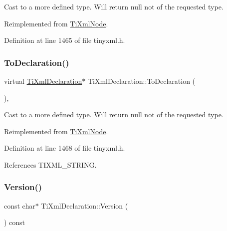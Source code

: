 Cast to a more defined type. Will return null not of the requested type. 



Reimplemented from \hyperlink{class_ti_xml_node_a0dc0831e89d499ca911a3be61a413d45}{Ti\+Xml\+Node}.



Definition at line 1465 of file tinyxml.\+h.

\hypertarget{class_ti_xml_declaration_a6bd3d1daddcaeb9543c24bfd090969ce}{}\label{class_ti_xml_declaration_a6bd3d1daddcaeb9543c24bfd090969ce} 
\subsubsection{\texorpdfstring{To\+Declaration()}{ToDeclaration()}\hspace{0.1cm}{\footnotesize\ttfamily [2/2]}}
{\footnotesize\ttfamily virtual \hyperlink{class_ti_xml_declaration}{Ti\+Xml\+Declaration}$\ast$ Ti\+Xml\+Declaration\+::\+To\+Declaration (\begin{DoxyParamCaption}{ }\end{DoxyParamCaption})\hspace{0.3cm}{\ttfamily [inline]}, {\ttfamily [virtual]}}



Cast to a more defined type. Will return null not of the requested type. 



Reimplemented from \hyperlink{class_ti_xml_node_a4027136ca820ff4a636b607231b6a6df}{Ti\+Xml\+Node}.



Definition at line 1468 of file tinyxml.\+h.



References T\+I\+X\+M\+L\+\_\+\+S\+T\+R\+I\+NG.

\hypertarget{class_ti_xml_declaration_a95cdcb9354ea220065bd378ffcacc7bd}{}\label{class_ti_xml_declaration_a95cdcb9354ea220065bd378ffcacc7bd} 
\subsubsection{\texorpdfstring{Version()}{Version()}}
{\footnotesize\ttfamily const char$\ast$ Ti\+Xml\+Declaration\+::\+Version (\begin{DoxyParamCaption}{ }\end{DoxyParamCaption}) const\hspace{0.3cm}{\ttfamily [inline]}}



